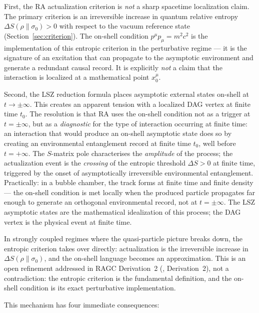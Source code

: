 \documentclass[11pt,a4paper]{article}
\theoremstyle{plain}
\theoremstyle{definition}
\theoremstyle{remark}
\begin{document}
First, the RA actualization criterion is \emph{not} a sharp spacetime localization
claim. The primary criterion is an irreversible increase in quantum relative
entropy $\Delta S(\rho \| \sigma_0) > 0$ with respect to the vacuum reference
state (Section~\ref{sec:criterion}). The on-shell condition $p^{\mu}p_{\mu} =
m^2 c^2$ is the implementation of this entropic criterion in the perturbative
regime --- it is the signature of an excitation that can propagate to the
asymptotic environment and generate a redundant causal record. It is explicitly
\emph{not} a claim that the interaction is localized at a mathematical point
$x_0^\mu$.

Second, the LSZ reduction formula places asymptotic external states on-shell
at $t \to \pm\infty$. This creates an apparent tension with a localized DAG
vertex at finite time $t_0$. The resolution is that RA uses the on-shell
condition not as a trigger at $t = \pm\infty$, but as a \emph{diagnostic} for
the type of interaction occurring at finite time: an interaction that would
produce an on-shell asymptotic state does so by creating an environmental
entanglement record at finite time $t_0$, well before $t = +\infty$.
The $S$-matrix pole characterises the \emph{amplitude} of the process;
the actualization event is the \emph{crossing} of the entropic threshold
$\Delta S > 0$ at finite time, triggered by the onset of asymptotically
irreversible environmental entanglement. Practically: in a bubble chamber,
the track forms at finite time and finite density --- the on-shell condition
is met locally when the produced particle propagates far enough to generate
an orthogonal environmental record, not at $t = \pm\infty$.
The LSZ asymptotic states are the mathematical idealization of this process;
the DAG vertex is the physical event at finite time.

In strongly coupled regimes where the quasi-particle picture breaks down, the
entropic criterion takes over directly: actualization is the irreversible
increase in $\Delta S(\rho \| \sigma_0)$, and the on-shell language becomes an
approximation. This is an open refinement addressed in RAGC
Derivation~2 (\citep{Sandeman2026RAGC}, Derivation~2),
not a contradiction: the entropic criterion is the fundamental definition,
and the on-shell condition is its exact perturbative implementation.

This mechanism has four immediate consequences:
\end{document}
